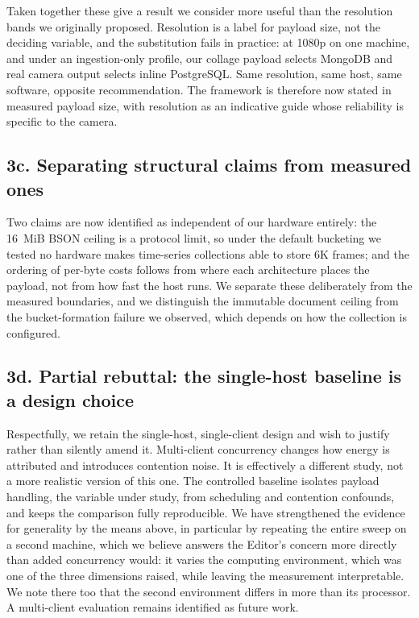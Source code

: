 \documentclass[11pt,a4paper]{article}
\begin{document}
Taken together these give a result we consider more useful than the resolution bands we originally
proposed. Resolution is a label for payload size, not the deciding variable, and the substitution fails in
practice: at 1080p on one machine, and under an ingestion-only profile, our collage payload selects MongoDB
and real camera output selects inline PostgreSQL. Same resolution, same host, same software, opposite
recommendation. The framework is
therefore now stated in measured payload size, with resolution as an indicative guide whose reliability is
specific to the camera.

\subsection*{3c. Separating structural claims from measured ones}

Two claims are now identified as independent of our hardware entirely: the 16~MiB BSON ceiling is a
protocol limit, so under the default bucketing we tested no hardware makes time-series collections able to
store 6K frames; and the ordering of per-byte costs follows from where each architecture places the payload,
not from how fast the host runs. We separate these deliberately from the measured boundaries, and we
distinguish the immutable document ceiling from the bucket-formation failure we observed, which depends on
how the collection is configured.

\subsection*{3d. Partial rebuttal: the single-host baseline is a design choice}

Respectfully, we retain the single-host, single-client design and wish to justify rather than
silently amend it. Multi-client concurrency changes how energy is attributed and introduces
contention noise. It is effectively a different study, not a more realistic version of this one. The
controlled baseline isolates payload handling, the variable under study, from scheduling and
contention confounds, and keeps the comparison fully reproducible. We have strengthened the evidence for generality by the means above, in particular by repeating the
entire sweep on a second machine, which we believe answers the Editor's concern more directly than
added concurrency would: it varies the computing environment, which was one of the three dimensions
raised, while leaving the measurement interpretable. We note there too that the second environment differs
in more than its processor. A multi-client evaluation remains identified as
future work.
\end{document}
